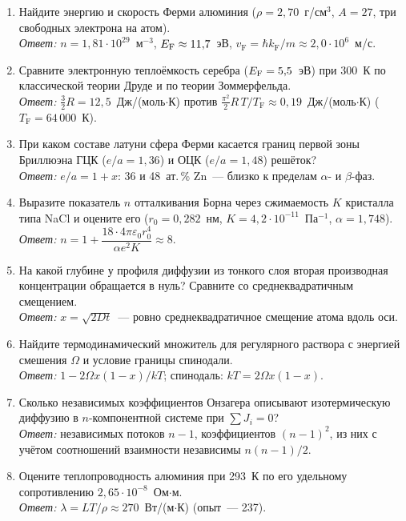 \begin{enumerate}[label={\sffamily\bfseries\color{fmHead}\arabic*.}]
\item Найдите энергию и скорость Ферми алюминия ($\rho=2{,}70$~г/см$^3$,
$A=27$, три свободных электрона на атом).\\
\emph{Ответ:} $n=1{,}81\cdot10^{29}$~м$^{-3}$, $E_{\mathrm{F}}\approx11{,}7$~эВ,
$v_\text{F}=\hbar k_\text{F}/m\approx2{,}0\cdot10^6$~м/с.
\item Сравните электронную теплоёмкость серебра ($E_{\mathrm{F}}=5{,}5$~эВ) при 300~К
по классической теории Друде и по теории Зоммерфельда.\\
\emph{Ответ:} $\frac32R=12{,}5$~Дж/(моль$\cdot$К) против
$\frac{\pi^2}{2}R\,T/T_\text{F}\approx0{,}19$~Дж/(моль$\cdot$К) ($T_\text{F}=64\,000$~К).
\item При каком составе латуни сфера Ферми касается границ первой зоны
Бриллюэна ГЦК ($e/a=1{,}36$) и ОЦК ($e/a=1{,}48$) решёток?\\
\emph{Ответ:} $e/a=1+x$: 36 и 48~ат.\,\% Zn~— близко к пределам
$\alpha$- и $\beta$-фаз.
\item Выразите показатель $n$ отталкивания Борна через сжимаемость $K$
кристалла типа NaCl и оцените его ($r_0=0{,}282$~нм, $K=4{,}2\cdot10^{-11}$~Па$^{-1}$,
$\alpha=1{,}748$).\\
\emph{Ответ:} $n=1+\dfrac{18\cdot4\pi\varepsilon_0r_0^4}{\alpha e^2K}\approx8$.
\item На какой глубине у профиля диффузии из тонкого слоя вторая
производная концентрации обращается в нуль? Сравните со
среднеквадратичным смещением.\\
\emph{Ответ:} $x=\sqrt{2Dt}$~— ровно среднеквадратичное смещение атома
вдоль оси.
\item Найдите термодинамический множитель для регулярного раствора с
энергией смешения $\Omega$ и условие границы спинодали.\\
\emph{Ответ:} $1-2\Omega x(1-x)/kT$; спинодаль: $kT=2\Omega x(1-x)$.
\item Сколько независимых коэффициентов Онзагера описывают
изотермическую диффузию в $n$-компонентной системе при $\sum J_i=0$?\\
\emph{Ответ:} независимых потоков $n-1$, коэффициентов $(n-1)^2$, из них с
учётом соотношений взаимности независимы $n(n-1)/2$.
\item Оцените теплопроводность алюминия при 293~К по его удельному
сопротивлению $2{,}65\cdot10^{-8}$~Ом$\cdot$м.\\
\emph{Ответ:} $\lambda=LT/\rho\approx270$~Вт/(м$\cdot$К) (опыт~— 237).

\end{enumerate}
